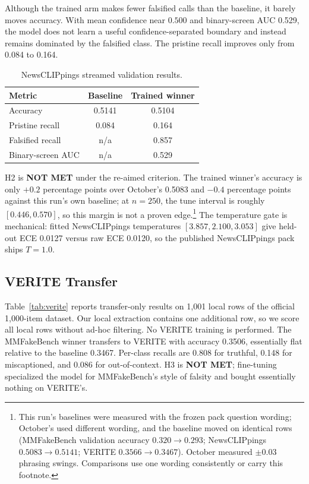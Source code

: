\documentclass{article} %
\begin{document}
Although the trained arm makes fewer falsified calls than the baseline, it barely moves accuracy. With mean confidence near \(0.500\) and binary-screen AUC 0.529, the model does not learn a useful confidence-separated boundary and instead remains dominated by the falsified class. The pristine recall improves only from 0.084 to 0.164.

\begin{table}[t]
\centering
\small
\caption{NewsCLIPpings streamed validation results.}
\label{tab:ncp}
\begin{tabular}{lcc}
\toprule
Metric & Baseline & Trained winner \\
\midrule
Accuracy & 0.5141 & 0.5104 \\
Pristine recall & 0.084 & 0.164 \\
Falsified recall & n/a & 0.857 \\
Binary-screen AUC & n/a & 0.529 \\
\bottomrule
\end{tabular}
\end{table}

H2 is \textbf{NOT MET} under the re-aimed criterion. The trained winner's accuracy is only \(+0.2\) percentage points over October's 0.5083 and \(-0.4\) percentage points against this run's own baseline; at \(n=250\), the tune interval is roughly \([0.446, 0.570]\), so this margin is not a proven edge.\footnote{This run's baselines were measured with the frozen pack question wording; October's used different wording, and the baseline moved on identical rows (MMFakeBench validation accuracy \(0.320\rightarrow0.293\); NewsCLIPpings \(0.5083\rightarrow0.5141\); VERITE \(0.3566\rightarrow0.3467\)). October measured \(\pm0.03\) phrasing swings. Comparisons use one wording consistently or carry this footnote.} The temperature gate is mechanical: fitted NewsCLIPpings temperatures \([3.857, 2.100, 3.053]\) give held-out ECE 0.0127 versus raw ECE 0.0120, so the published NewsCLIPpings pack ships \(T=1.0\).

\subsection{VERITE Transfer}
Table~\ref{tab:verite} reports transfer-only results on 1,001 local rows of the official 1,000-item dataset. Our local extraction contains one additional row, so we score all local rows without ad-hoc filtering. No VERITE training is performed. The MMFakeBench winner transfers to VERITE with accuracy 0.3506, essentially flat relative to the baseline 0.3467. Per-class recalls are 0.808 for truthful, 0.148 for miscaptioned, and 0.086 for out-of-context. H3 is \textbf{NOT MET}; fine-tuning specialized the model for MMFakeBench's style of falsity and bought essentially nothing on VERITE's.
\end{document}
